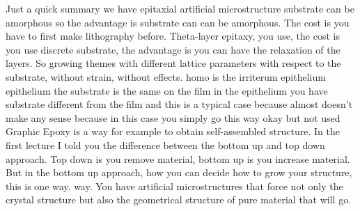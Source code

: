 Just a quick summary we have epitaxial artificial microstructure substrate can be amorphous so the advantage is substrate can can be amorphous. The cost is you have to first make lithography before. Theta-layer epitaxy, you use, the cost is you use discrete substrate, the advantage is you can have the relaxation of the layers. So growing themes with different lattice parameters with respect to the substrate, without strain, without effects. homo is the irriterum epithelium epithelium the substrate is the same on the film in the epithelium you have substrate different from the film and this is a typical case because almost doesn't make any sense because in this case you simply go this way okay but not used Graphic Epoxy is a way for example to obtain self-assembled structure. In the first lecture I told you the difference between the bottom up and top down approach. Top down is you remove material, bottom up is you increase material. But in the bottom up approach, how you can decide how to grow your structure, this is one way. way. You have artificial microstructures that force not only the crystal structure but also the geometrical structure of pure material that will go.
